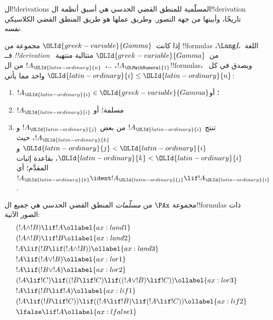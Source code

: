 \documentclass[../../../include/open-logic-section]{subfiles}
\begin{document}


ال!!{derivation}s المسلّمية للمنطق القضي الحدسي هي أسبق أنظمة
ال!!{derivation} تاريخًا، وأبينها من جهة التصور. وطريق عملها هو طريق
المنطق القضي الكلاسيكي نفسه.

\begin{defn}[!!^{derivability}]
إذا كانت~$\OLId{greek-variable}{Gamma}$ مجموعة من !!{formula}s اللغة~$\Lang L$، فــ
\emph{!!{derivation}} من~$\OLId{greek-variable}{Gamma}$ متتالية منتهية~$!A_\OLMathNumeral{1}$،
\dots،~$!A_\OLId{latin-ordinary}{n}$ من ال!!{formula}s، ويصدق في كل~$\OLId{latin-ordinary}{i} \le \OLId{latin-ordinary}{n}$ واحد مما يأتي:
\begin{enumerate}
\item $!A_\OLId{latin-ordinary}{i} \in \OLId{greek-variable}{Gamma}$؛ أو
\item $!A_\OLId{latin-ordinary}{i}$ مسلمة؛ أو
\item تنتج $!A_\OLId{latin-ordinary}{i}$ من بعض $!A_\OLId{latin-ordinary}{j}$ و$!A_\OLId{latin-ordinary}{k}$، حيث $\OLId{latin-ordinary}{j} < \OLId{latin-ordinary}{i}$ و$\OLId{latin-ordinary}{k} < \OLId{latin-ordinary}{i}$،
  بقاعدة إثبات المقدَّم؛ أي $!A_\OLId{latin-ordinary}{k} \ident !A_\OLId{latin-ordinary}{j} \lif !A_\OLId{latin-ordinary}{i}$.
\end{enumerate}
\end{defn}

\begin{defn}
مجموعة $\PAx$ من \emph{مسلّمات} المنطق القضي الحدسي هي جميع
ال!!{formula}s ذات الصور الآتية:
\begin{align}
  & (!A \land !B) \lif !A \ollabel{ax:land1}\\
  & (!A \land !B) \lif !B \ollabel{ax:land2}\\
  & !A \lif (!B \lif (!A \land !B)) \ollabel{ax:land3}\\
  & !A \lif (!A \lor !B) \ollabel{ax:lor1}\\
  & !A \lif (!B \lor !A) \ollabel{ax:lor2}\\
  & (!A \lif !C) \lif ((!B \lif !C) \lif ((!A \lor !B) \lif !C)) \ollabel{ax:lor3}\\
  & !A \lif (!B \lif !A) \ollabel{ax:lif1}\\
  & (!A \lif (!B \lif !C)) \lif ((!A \lif !B) \lif (!A \lif !C)) \ollabel{ax:lif2}\\
  & \lfalse \lif !A \ollabel{ax:lfalse1}
\end{align}
\end{defn}
\end{document}
